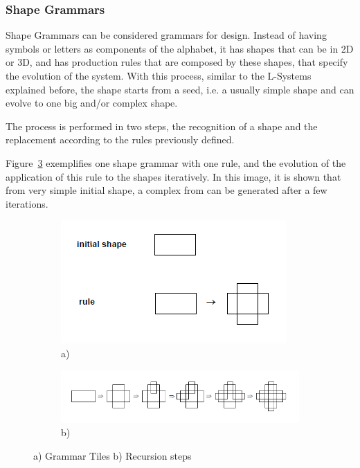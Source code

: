 
\subsubsection{Shape Grammars} %
\label{ssub:shape_grammars}


Shape Grammars can be considered grammars for design. Instead of having symbols or letters as components of the alphabet, it has shapes that can be in 2D or 3D, and has production rules that are composed by these shapes, that specify the evolution of the system. With this process, similar to the L-Systems explained before, the shape starts from a seed, i.e. a usually simple shape and can evolve to one big and/or complex shape.

The process is performed in two steps, the recognition of a shape and the replacement according to the rules previously defined. 

Figure~\ref{fig:SGrammars} exemplifies one shape grammar with one rule, and the evolution of the application of this rule to the shapes iteratively. In this image, it is shown that from very simple initial shape, a complex from can be generated after a few iterations.

\begin{figure}
        \centering
		\begin{subfigure}[b]{0.55\textwidth}
			\includegraphics[width=\textwidth]{img/Theory/Shape_Grammars/Grammar.png}
			\caption{a)}
			\label{fig:SGGrammar}
		\end{subfigure}
        
		\begin{subfigure}[b]{0.55\textwidth}
			\includegraphics[width=\textwidth]{img/Theory/Shape_Grammars/Recursion.png}
			\caption{b)}
			\label{fig:SGRecursion}
		\end{subfigure}
        \caption{a) Grammar Tiles b) Recursion steps}
        \label{fig:SGrammars}
\end{figure}

